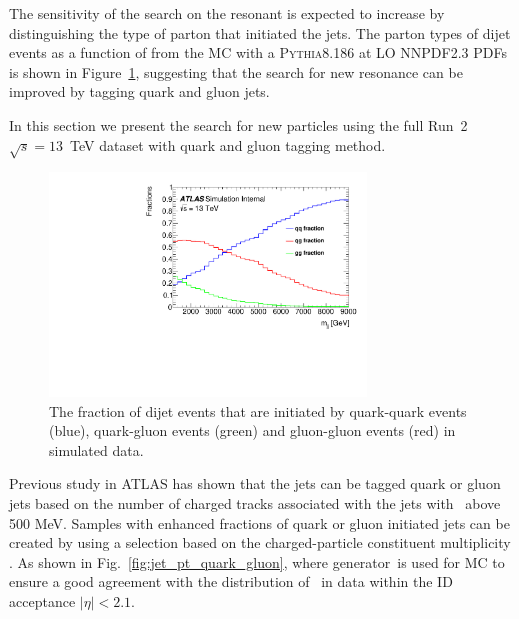 The sensitivity of the search on the resonant is expected to increase by distinguishing the type of parton that initiated the jets. The parton types of dijet events as a function of \mjj from the MC with a  \textsc{Pythia8.186} at LO  NNPDF2.3 PDFs is shown in Figure~\ref{fig:quarkgluonfraction}, suggesting that the search for new resonance can be improved by tagging quark and gluon jets.


In this section we present the search for new particles using the full Run~2 $\sqrt{s} = 13$~TeV\xspace dataset with quark and gluon tagging method.


\begin{figure}[htb]
 \centering
\includegraphics[width=0.75\textwidth]{fig/tagging/Fractions_QCD.pdf}
\caption{The fraction of dijet events that are initiated by quark-quark events (blue), quark-gluon 
events (green) and gluon-gluon events (red) in simulated data.  \label{fig:quarkgluonfraction}}
\end{figure}


Previous study in ATLAS has shown that the jets can be tagged quark or gluon jets based on the number of charged tracks associated with the jets with \pt~above 500 MeV. Samples with enhanced fractions of quark or gluon initiated jets can be created by using a selection based on the charged-particle constituent multiplicity \ntrk. As shown in Fig.~\ref{fig:jet_pt_quark_gluon}, where  generator~is used for MC to ensure a good agreement with the distribution of \ntrk~in data within the ID acceptance $|\eta|<2.1$.

